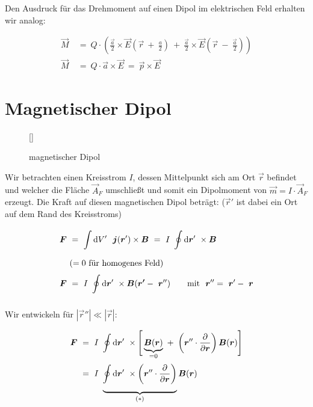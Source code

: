 Den Ausdruck für das Drehmoment auf einen Dipol im elektrischen Feld erhalten wir analog:

\begin{align*}
\vec{M}  \ &= \ Q \cdot \left(\frac{\vec{a}}{2} \times \vec{E}\left(\vec{r} \ + \ \frac{a}{2}\right) \ + \ \frac{\vec{a}}{2} \times \vec{E}\left(\vec{r} \ - \ \frac{\vec{a}}{2}\right)\right)\\
\vec{M}  \ &= \ Q \cdot \vec{a}\times\vec{E}  \ = \ \vec{p}\times\vec{E} 
\end{align*}

\section{Magnetischer Dipol}
\begin{wrapfigure}[10]{l}[0cm]{0cm}
	\raisebox{0pt}[\dimexpr{}\baselineskip\relax]{
		\colorbox{hgrey}{
		}
	}
	\caption{magnetischer Dipol}
\end{wrapfigure}
Wir betrachten einen Kreisstrom $I$, dessen Mittelpunkt sich am Ort $\vec{r}$ befindet und welcher die Fläche $\vec{A}_F$ umschließt und somit ein Dipolmoment von $\vec{m} = I \cdot \vec{A}_F$ erzeugt. Die Kraft auf diesen magnetischen Dipol beträgt: ($\vec{r}'$ ist dabei ein Ort auf dem Rand des Kreisstroms)

\begin{align*}
\vec{F} \ &= \ \Int{}{}{V'} \ \vec{j}(\vec{r}') \times \vec{B}  \ = \ I \ \Oint{}{}{\vec{r}'} \times\vec{B} \qquad \\
&(= 0 \text{ für homogenes Feld})\\
\vec{F} \ &= \ I \ \Oint{}{}{\vec{r}'} \times \vec{B}(\vec{r'} - \ \vec{r}'') \qquad \text{mit }\  \vec{r}''  = \ \vec{r}' - \ \vec{r} 
\end{align*}

Wir entwickeln für $|\vec{r}''| \ll |\vec{r}|$: 

\begin{align*}
\bm{F} \ &= \ I \ \oint\limits_{{}}^{{}}\mathrm{d}{\bm{r}'}\  \times \Bigg[ \underbrace{\bm{B}(\bm{r})}_{=0} \ + \ \left(\bm{r}'' \cdot\frac{\partial{}}{\partial{\bm{r}}}\right)\bm{B}(\bm{r})\Bigg]\\
&= \ I \ \underbrace{\oint\limits_{{}}^{{}}\mathrm{d}{\bm{r}'}\ \times\left(\bm{r}'' \cdot \frac{\partial{}}{\partial{\bm{r}}}\right)}_{(*)}\bm{B}(\bm{r}) 
\end{align*}

